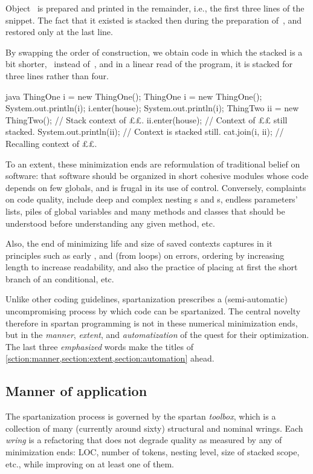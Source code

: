\begin{enumerate}
  Object~ is prepared and printed in the remainder, i.e., the first three
  lines of the snippet. The fact that it existed is stacked then during the
  preparation of~, and restored only at the last line.

  By swapping the order of construction, we obtain code in which the stacked is
  a bit shorter,~ instead of~, and in a linear read of the
  program, it is stacked for three lines rather than four.

\begin{code}[minipage,width=54ex]{java}
ThingOne i = new ThingOne();
ThingOne i = new ThingOne();
System.out.println(i);
i.enter(house);
System.out.println(i);
ThingTwo ii = new ThingTwo(); // Stack context of ££.
ii.enter(house);              // Context of ££ still stacked.
System.out.println(ii);       // Context is stacked still.
cat.join(i, ii);              // Recalling context of ££.
  \end{code}
\end{enumerate}

To an extent, these minimization ends are reformulation of traditional belief
on software: that software should be organized in short cohesive modules whose
code depends on few globals, and is frugal in its use of control.  Conversely,
complaints on code quality, include deep and complex nesting s and
s, endless parameters' lists, piles of global variables and many
methods and classes that should be understood before understanding any given
method, etc.

Also, the end of minimizing life and size of saved contexts captures in it
principles such as early ,  and  (from loops) on
errors, ordering by increasing length to increase readability, and also the
practice of placing at first the short branch of an  conditional, etc.

Unlike other coding guidelines, spartanization prescribes a (semi-automatic)
uncompromising process by which code can be spartanized. The central novelty
therefore in spartan programming is not in these numerical minimization ends,
but in the \emph{manner}, \emph{extent}, and \emph{automatization} of the quest
for their optimization. The last three \emph{emphasized} words make the titles
of \cref{sction:manner,section:extent,section:automation} ahead.

\subsection{Manner of application}
\label{section:manner}
The spartanization process is governed by the spartan
\emph{toolbox}, which is a collection of many (currently around sixty)
structural and nominal wrings. Each \emph{wring} is a refactoring that does
not degrade quality as measured by any of minimization ends: LOC, number of
tokens, nesting level, size of stacked scope, etc., while improving on at least
one of them.

